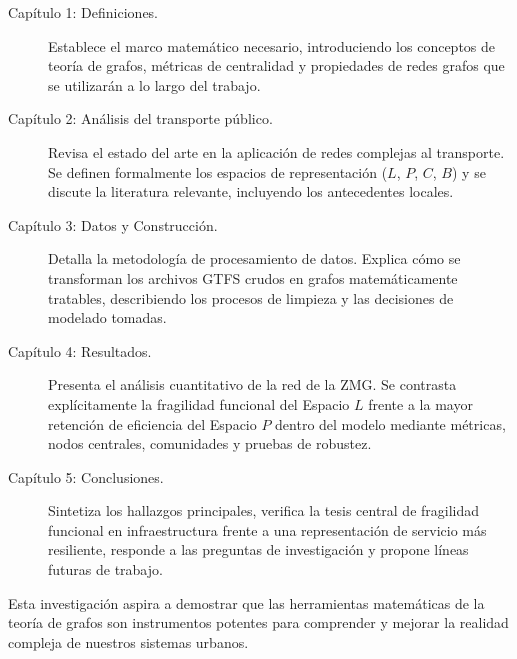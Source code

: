 \begin{description}
    \item[Capítulo 1: Definiciones.] Establece el marco matemático necesario, introduciendo los conceptos de teoría de grafos, métricas de centralidad y propiedades de redes grafos que se utilizarán a lo largo del trabajo.
    
    \item[Capítulo 2: Análisis del transporte público.] Revisa el estado del arte en la aplicación de redes complejas al transporte. Se definen formalmente los espacios de representación ($L$, $P$, $C$, $B$) y se discute la literatura relevante, incluyendo los antecedentes locales.
    
    \item[Capítulo 3: Datos y Construcción.] Detalla la metodología de procesamiento de datos. Explica cómo se transforman los archivos GTFS crudos en grafos matemáticamente tratables, describiendo los procesos de limpieza y las decisiones de modelado tomadas.
    
    \item[Capítulo 4: Resultados.] Presenta el análisis cuantitativo de la red de la ZMG. Se contrasta explícitamente la fragilidad funcional del Espacio $L$ frente a la mayor retención de eficiencia del Espacio $P$ dentro del modelo mediante métricas, nodos centrales, comunidades y pruebas de robustez.
     
    \item[Capítulo 5: Conclusiones.] Sintetiza los hallazgos principales, verifica la tesis central de fragilidad funcional en infraestructura frente a una representación de servicio más resiliente, responde a las preguntas de investigación y propone líneas futuras de trabajo.
\end{description}

Esta investigación aspira a demostrar que las herramientas matemáticas de la teoría de grafos son instrumentos potentes para comprender y mejorar la realidad compleja de nuestros sistemas urbanos.
